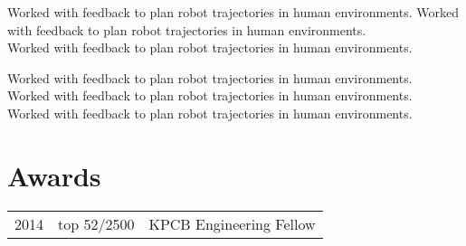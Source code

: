 \documentclass[]{deedy-resume-openfont}
\begin{document}
\begin{minipage}[t]{0.66\textwidth}
Worked with feedback to plan robot trajectories in human environments.
Worked with feedback to plan robot trajectories in human environments.\\
Worked with feedback to plan robot trajectories in human environments.\\
\sectionsep

Worked with feedback to plan robot trajectories in human environments.\\
Worked with feedback to plan robot trajectories in human environments.\\
Worked with feedback to plan robot trajectories in human environments.\\
\sectionsep


\section{Awards}

\begin{tabular}{rll}
2014	     & top 52/2500  & KPCB Engineering Fellow\\
\end{tabular}
\sectionsep




%
%

\end{minipage}
\end{document}

